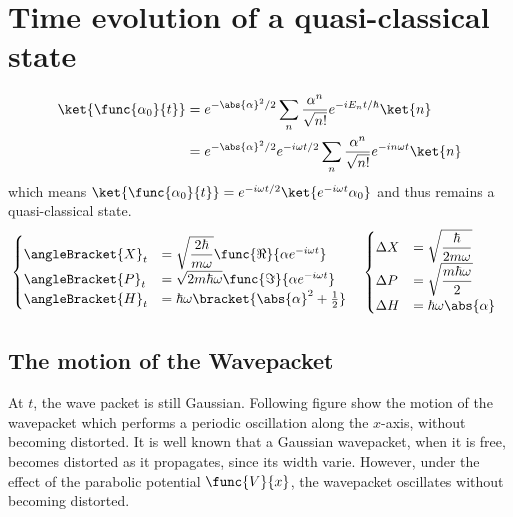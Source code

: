 \section{Time evolution of a quasi-classical state}
\begin{align*}
    \ket{\func{\alpha_0}{t}} &= e^{- \abs{\alpha}^2/2} \sum_{n} \dfrac{\alpha^n}{\sqrt{n!}} e^{-i E_n t/\hbar} \ket{n}\\
    &= e^{- \abs{\alpha}^2/2} e^{-i\omega t/2} \sum_{n} \dfrac{\alpha^n}{\sqrt{n!}} e^{-i n \omega t} \ket{n}
\end{align*}
which means \(\ket{\func{\alpha_0}{t}} = e^{-i\omega t/2}\ket{e^{-i\omega t} \alpha_0}\) and thus remains a quasi-classical state.
\begin{align*}
    &\begin{cases}
        \angleBracket{X}_t &= \sqrt{\dfrac{2\hbar}{m\omega}} \func{\Re}{\alpha e^{-i \omega t}}\\
        \angleBracket{P}_t &= \sqrt{2m\hbar\omega} \func{\Im}{\alpha e^{-i \omega t}}\\
        \angleBracket{H}_t &= \hbar \omega \bracket{\abs{\alpha}^2 + \frac{1}{2}}
    \end{cases} & 
    & \begin{cases}
        \Delta X &= \sqrt{\dfrac{\hbar}{2m\omega}}\\
        \Delta P &= \sqrt{\dfrac{m\hbar\omega}{2}}\\
        \Delta H &= \hbar \omega \abs{\alpha}
    \end{cases}
\end{align*}
\subsection{The motion of the Wavepacket}
At \(t\), the wave packet is still Gaussian. Following figure show the motion of the wavepacket which performs a periodic oscillation along the \(x\)-axis, without becoming distorted. It is well known that a Gaussian wavepacket, when it is free, becomes distorted as it propagates, since its width varie. However, under the effect of the parabolic potential \(\func{V}{x}\), the wavepacket oscillates without becoming distorted.

